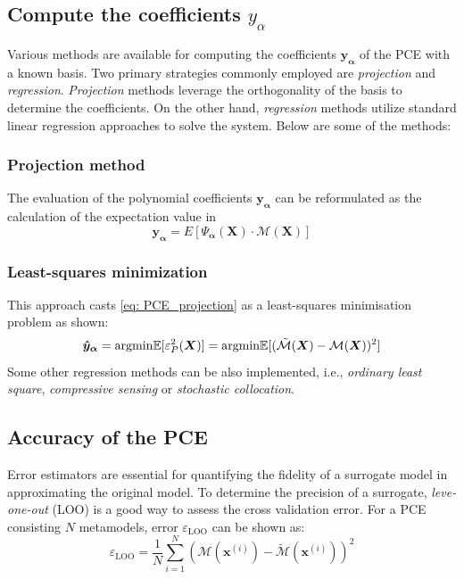 \subsection{Compute the coefficients $y_{\alpha}$}
Various methods are available for computing the coefficients $\boldsymbol{y_{\alpha}}$ of the \acrshort{PCE} with a known basis. Two primary strategies commonly employed are \textit{projection} and \textit{regression}. \textit{Projection} methods leverage the orthogonality of the basis to determine the coefficients. On the other hand, \textit{regression} methods utilize standard linear regression approaches to solve the system. Below are some of the methods:

\subsubsection{Projection method}
The evaluation of the polynomial coefficients $\boldsymbol{y_{\alpha}}$ can be reformulated as the calculation of the expectation value in 
\begin{equation}
\label{eq: PCE_projection}
\boldsymbol{y_{\alpha}} = E [\Psi_{\boldsymbol{\alpha}}(\boldsymbol{X}) \cdot \mathcal{M}(\boldsymbol{X})]
\end{equation}

\subsubsection{Least-squares minimization}
This approach casts \cref{eq: PCE_projection} as a least-squares minimisation problem as shown:
\begin{equation}
\boldsymbol{\hat{y}_{\alpha}} = {\rm{argmin}} \mathbb{E} [\varepsilon_{P}^2(\boldsymbol{X})] = {\rm{argmin}} \mathbb{E} [(\tilde{\mathcal{M}}(\boldsymbol{X}) - \mathcal{M}(\boldsymbol{X}))^2]
\end{equation}
Some other regression methods can be also implemented, i.e., \textit{ordinary least square}, \textit{compressive sensing} or \textit{stochastic collocation}.


\subsection{Accuracy of the \acrshort{PCE}}
Error estimators are essential for quantifying the fidelity of a surrogate model in approximating the original model. To determine the precision of a surrogate, \textit{leve-one-out} (LOO) is a good way to assess the cross validation error. For a \acrshort{PCE} consisting $N$ metamodels, error $\varepsilon_{\text{LOO}}$ can be shown as:
\begin{equation}
\varepsilon_{\text{LOO}} = \frac{1}{N} \sum_{i=1}^{N} \left( \mathcal{M}(\boldsymbol{x}^{(i)}) - \tilde{\mathcal{M}}(\boldsymbol{x}^{(i)}) \right)^2
\end{equation}




